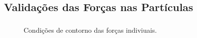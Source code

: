 \documentclass{beamer}
\begin{document}
\subsection{Validações das Forças nas Partículas}
\begin{frame}
  \frametitle{\subsecname}
  
  \begin{minipage}{.48\textwidth}
    \centering
    \begin{figure}
       {\raggedleft \tiny Condições de contorno das forças indiviuais.}
    \end{figure}
  \end{minipage}
  \hfill
  \begin{minipage}{.48\textwidth}
    \begin{figure}
      \stackunder{
}
\end{figure}
\end{minipage}
\end{frame}
\end{document}
